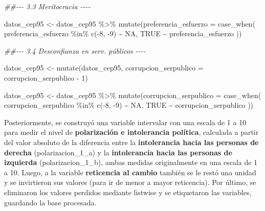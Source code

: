 \documentclass[
  spanish,
  a4paper,
  oneside]{scrbook}
\newenvironment{Shaded}{\begin{snugshade}}{\end{snugshade}}
\newcommand{\AttributeTok}[1]{\textcolor[rgb]{0.40,0.45,0.13}{#1}}
\newcommand{\ConstantTok}[1]{\textcolor[rgb]{0.56,0.35,0.01}{#1}}
\newcommand{\DecValTok}[1]{\textcolor[rgb]{0.68,0.00,0.00}{#1}}
\newcommand{\DocumentationTok}[1]{\textcolor[rgb]{0.37,0.37,0.37}{\textit{#1}}}
\newcommand{\FunctionTok}[1]{\textcolor[rgb]{0.28,0.35,0.67}{#1}}
\newcommand{\NormalTok}[1]{\textcolor[rgb]{0.00,0.23,0.31}{#1}}
\newcommand{\OtherTok}[1]{\textcolor[rgb]{0.00,0.23,0.31}{#1}}
\newcommand{\SpecialCharTok}[1]{\textcolor[rgb]{0.37,0.37,0.37}{#1}}
\begin{document}
\begin{Shaded}
\begin{Highlighting}[]
\DocumentationTok{\#\#{-}{-}{-} 3.3 Meritocracia {-}{-}{-}{-}}

\NormalTok{datos\_cep95 }\OtherTok{\textless{}{-}}\NormalTok{ datos\_cep95 }\SpecialCharTok{\%\textgreater{}\%} 
  \FunctionTok{mutate}\NormalTok{(}\AttributeTok{preferencia\_esfuerzo =} \FunctionTok{case\_when}\NormalTok{(}
\NormalTok{    preferencia\_esfuerzo }\SpecialCharTok{\%in\%} \FunctionTok{c}\NormalTok{(}\SpecialCharTok{{-}}\DecValTok{8}\NormalTok{, }\SpecialCharTok{{-}}\DecValTok{9}\NormalTok{) }\SpecialCharTok{\textasciitilde{}} \ConstantTok{NA}\NormalTok{,}
    \ConstantTok{TRUE} \SpecialCharTok{\textasciitilde{}}\NormalTok{ preferencia\_esfuerzo}
\NormalTok{  ))}

\DocumentationTok{\#\#{-}{-}{-} 3.4 Desconfianza en serv. públicos {-}{-}{-}{-}}

\NormalTok{datos\_cep95 }\OtherTok{\textless{}{-}} \FunctionTok{mutate}\NormalTok{(datos\_cep95,}
                \AttributeTok{corrupcion\_serpublico =}\NormalTok{ corrupcion\_serpublico }\SpecialCharTok{{-}} \DecValTok{1}\NormalTok{)}

\NormalTok{datos\_cep95 }\OtherTok{\textless{}{-}}\NormalTok{ datos\_cep95 }\SpecialCharTok{\%\textgreater{}\%} 
  \FunctionTok{mutate}\NormalTok{(}\AttributeTok{corrupcion\_serpublico =} \FunctionTok{case\_when}\NormalTok{(}
\NormalTok{    corrupcion\_serpublico }\SpecialCharTok{\%in\%} \FunctionTok{c}\NormalTok{(}\SpecialCharTok{{-}}\DecValTok{8}\NormalTok{, }\SpecialCharTok{{-}}\DecValTok{9}\NormalTok{) }\SpecialCharTok{\textasciitilde{}} \ConstantTok{NA}\NormalTok{,}
    \ConstantTok{TRUE} \SpecialCharTok{\textasciitilde{}}\NormalTok{ corrupcion\_serpublico}
\NormalTok{  ))}
\end{Highlighting}
\end{Shaded}

Posteriormente, se construyó una variable intervalar con una escala de 1
a 10 para medir el nivel de \textbf{polarización e intolerancia
política}, calculada a partir del valor absoluto de la diferencia entre
la \textbf{intolerancia hacia las personas de derecha}
(polarizacion\_1\_a) y la \textbf{intolerancia hacia las personas de
izquierda} (polarizacion\_1\_b), ambas medidas originalmente en una
escala de 1 a 10. Luego, a la variable \textbf{reticencia al cambio}
también se le restó una unidad y se invirtieron sus valores (para ir de
menor a mayor reticencia). Por último, se eliminaron los valores
perdidos mediante listwise y se etiquetaron las variables, guardando la
base procesada.
\end{document}

